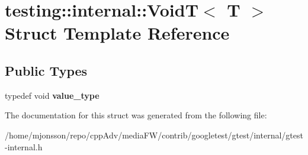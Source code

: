 \hypertarget{structtesting_1_1internal_1_1VoidT}{}\section{testing\+:\+:internal\+:\+:VoidT$<$ T $>$ Struct Template Reference}
\label{structtesting_1_1internal_1_1VoidT}
\subsection*{Public Types}
\begin{DoxyCompactItemize}
\item 
\mbox{\label{structtesting_1_1internal_1_1VoidT_a29e6a3f3989ddb47103944b350f1bec0}} 
typedef void {\bfseries value\+\_\+type}
\end{DoxyCompactItemize}


The documentation for this struct was generated from the following file\+:\begin{DoxyCompactItemize}
\item 
/home/mjonsson/repo/cpp\+Adv/media\+F\+W/contrib/googletest/gtest/internal/gtest-\/internal.\+h\end{DoxyCompactItemize}
